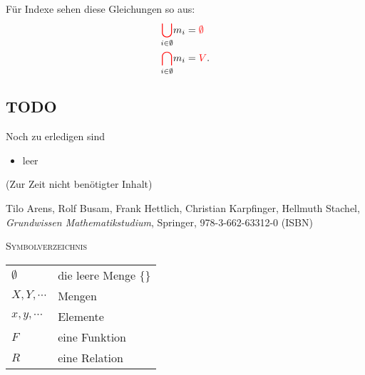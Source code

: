 \documentclass[a4paper]{amsart}
\theoremstyle{definition}
\begin{document}
Für Indexe sehen diese Gleichungen so aus:
\begin{alignat}{4}\label{LeererIndex}
   &{\color{red} \bigcup_{\color{black}i \in \emptyset}} m_i = {\color{red} \emptyset}\\
   &{\color{red} \bigcap_{\color{black}i \in \emptyset}} m_i = {\color{red} V}.
\end{alignat}
 
\begin{backup}
\section{TODO}
Noch zu erledigen sind
\begin{itemize}
   \item leer
\end{itemize}
\end{backup}

\begin{backup}
    (Zur Zeit nicht benötigter Inhalt)
\end{backup}

\begin{thebibliography}{9}

      Tilo Arens, Rolf Busam, Frank Hettlich, Christian Karpfinger, Hellmuth Stachel, \emph{Grundwissen Mathematikstudium},
      Springer, 978-3-662-63312-0 (ISBN)

\end{thebibliography}

\begin{large}
    \centerline{\textsc{Symbolverzeichnis}}
\end{large}
\bigskip

\renewcommand*{\arraystretch}{1}

\begin{tabular}{ll}
    $\emptyset$             & die leere Menge $\{\}$\\
    $X, Y, \cdots$          & Mengen\\
    $x, y, \cdots$             & Elemente\\
    $F$                 & eine Funktion\\
    $R$             & eine Relation

\end{tabular}
\end{document}
